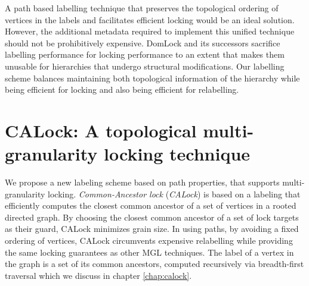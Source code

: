 A path based labelling technique that preserves the topological ordering of vertices in the labels and facilitates efficient locking would be an ideal solution. However, the additional metadata required to implement this unified technique should not be prohibitively expensive. DomLock and its successors sacrifice labelling performance for locking performance to an extent that makes them unusable for hierarchies that undergo structural modifications. Our labelling scheme balances maintaining both topological information of the hierarchy while being efficient for locking and also being efficient for relabelling. 

\section{CALock: A topological multi-granularity locking technique}

We propose a new labeling scheme based on path properties, that supports multi-granularity locking. {\em Common-Ancestor lock} ({\em CALock}) is based on a labeling that efficiently computes the closest common ancestor of a set of vertices in a rooted directed graph.
By choosing the closest common ancestor of a set of lock targets as their guard, CALock minimizes grain size. In using paths, by avoiding a fixed ordering of vertices, CALock circumvents expensive relabelling while providing the same locking guarantees as other MGL techniques. The label of a vertex in the graph is a set of its common ancestors, computed recursively via breadth-first traversal which we discuss in chapter \ref{chap:calock}.